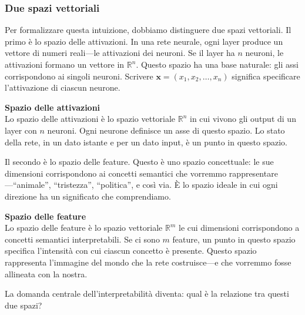 \subsubsection{Due spazi vettoriali}
Per formalizzare questa intuizione, dobbiamo distinguere due spazi vettoriali.
Il primo è lo spazio delle attivazioni. In una rete neurale, ogni layer produce un vettore di numeri reali—le attivazioni dei neuroni. Se il layer ha $n$ neuroni, le attivazioni formano un vettore in $\mathbb{R}^n$. Questo spazio ha una base naturale: gli assi corrispondono ai singoli neuroni. Scrivere $\mathbf{x} = (x_1, x_2, \dots, x_n)$ significa specificare l'attivazione di ciascun neurone.
\begin{notebox}
\textbf{Spazio delle attivazioni}\\
Lo spazio delle attivazioni è lo spazio vettoriale $\mathbb{R}^n$ in cui vivono gli output di un layer con $n$ neuroni. Ogni neurone definisce un asse di questo spazio. Lo stato della rete, in un dato istante e per un dato input, è un punto in questo spazio.
\end{notebox}
Il secondo è lo spazio delle feature. Questo è uno spazio concettuale: le sue dimensioni corrispondono ai concetti semantici che vorremmo rappresentare—``animale'', ``tristezza'', ``politica'', e così via. È lo spazio ideale in cui ogni direzione ha un significato che comprendiamo.
\begin{notebox}
\textbf{Spazio delle feature}\\
Lo spazio delle feature è lo spazio vettoriale $\mathbb{R}^m$ le cui dimensioni corrispondono a concetti semantici interpretabili. Se ci sono $m$ feature, un punto in questo spazio specifica l'intensità con cui ciascun concetto è presente. Questo spazio rappresenta l'immagine del mondo che la rete costruisce—e che vorremmo fosse allineata con la nostra.
\end{notebox}
La domanda centrale dell'interpretabilità diventa: qual è la relazione tra questi due spazi?
